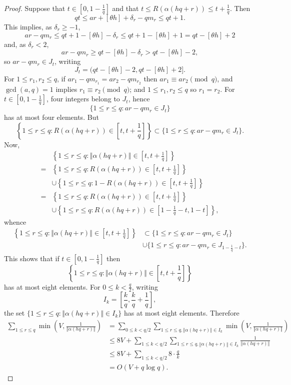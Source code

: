 \documentclass{amsart}
\newcommand{\norm}[1]{\left\Vert #1 \right\Vert}
\begin{document}
\begin{proof}
Suppose that $t \in \left[0, 1-\frac{1}{q}\right]$ and that $t \leq R(\alpha(hq+r)) \leq t+\frac{1}{q}$.
Then
\[
qt \leq ar+[\theta h]+\delta_r - qm_r \leq qt+1.
\]
This implies, as $\delta_r \geq -1$,
\[
ar-qm_r \leq qt+1 - [\theta h] - \delta_r \leq qt+1 -[\theta h] + 1 = qt-[\theta h]+2
\]
and, as $\delta_r < 2$,
\[
ar-qm_r \geq qt - [\theta h]-\delta_r > qt - [\theta h] - 2,
\]
so $ar-qm_r  \in J_t$, writing
\[
J_t=(qt-[\theta h]-2,qt-[\theta h]+2].
\] 
For $1 \leq r_1,r_2 \leq  q$, if $ar_1-qm_{r_1} = ar_2-qm_{r_2}$ then $ar_1 \equiv ar_2 \pmod{q}$, and 
$\gcd(a,q)=1$ implies $r_1 \equiv r_2 \pmod{q}$; and $1 \leq r_1,r_2 \leq q$ so
$r_1=r_2$. 
For
$t \in \left[0, 1-\frac{1}{q}\right]$,
four integers belong to $J_t$, hence
\[
\{1 \leq r \leq q: ar-qm_r \in J_t\}
\]
has at most four elements. But 
\[
\left\{1 \leq r \leq q: R(\alpha(hq+r)) \in \left[t,t+\frac{1}{q}\right]\right\}
\subset \{1 \leq r \leq q: ar-qm_r \in J_t\}.
\]
Now,
\[
\begin{split}
&\left\{1 \leq r \leq q: \norm{\alpha(hq+r)} \in \left[t,t+\frac{1}{q}\right]\right\}\\
=&\left\{1 \leq r \leq q: R(\alpha(hq+r)) \in \left[t,t+\frac{1}{q}\right]\right\}\\
&\cup \left\{1 \leq r \leq q: 1-R(\alpha(hq+r)) \in \left[t,t+\frac{1}{q}\right]\right\}\\
=&\left\{1 \leq r \leq q: R(\alpha(hq+r)) \in \left[t,t+\frac{1}{q}\right]\right\}\\
&\cup \left\{1 \leq r \leq q: R(\alpha(hq+r)) \in \left[1-\frac{1}{q}-t,1-t\right]\right\},
\end{split}
\]
whence
\begin{align*}
\left\{1 \leq r \leq q: \norm{\alpha(hq+r)} \in \left[t,t+\frac{1}{q}\right]\right\} &\subset 
\{1 \leq r \leq q: ar-qm_r \in J_t\}\\
&\cup \{1 \leq r \leq q: ar-qm_r \in J_{1-\frac{1}{q}-t}\}.
\end{align*}
This shows that if $t \in \left[0,1-\frac{1}{q}\right]$ then
\[
\left\{1 \leq r \leq q: \norm{\alpha(hq+r)} \in \left[t,t+\frac{1}{q}\right]\right\}
\]  
has at most eight elements. For   $0 \leq k < \frac{q}{2}$, writing
\[
I_k = \left[\frac{k}{q},\frac{k}{q}+\frac{1}{q}\right],
\] 
the set $\{1 \leq r \leq q: \norm{\alpha(hq+r)} \in I_k\}$ has at most eight elements. Therefore
\begin{align*}
\sum_{1 \leq r \leq q} \min\left(V,\frac{1}{\norm{\alpha(hq+r)}}\right)&=
\sum_{0 \leq k < q/2} \sum_{1 \leq r \leq q, \norm{\alpha(hq+r)} \in I_k} \min\left(V,\frac{1}{\norm{\alpha(hq+r)}}\right)\\
&\leq 8V + \sum_{1 \leq k < q/2} \sum_{1 \leq r \leq q, \norm{\alpha(hq+r)} \in I_k} \frac{1}{\norm{\alpha(hq+r)}}\\
&\leq 8V + \sum_{1 \leq k < q/2}  8 \cdot \frac{q}{k}\\
&=O(V+q \log q).
\end{align*}
\end{proof}
\end{document}
